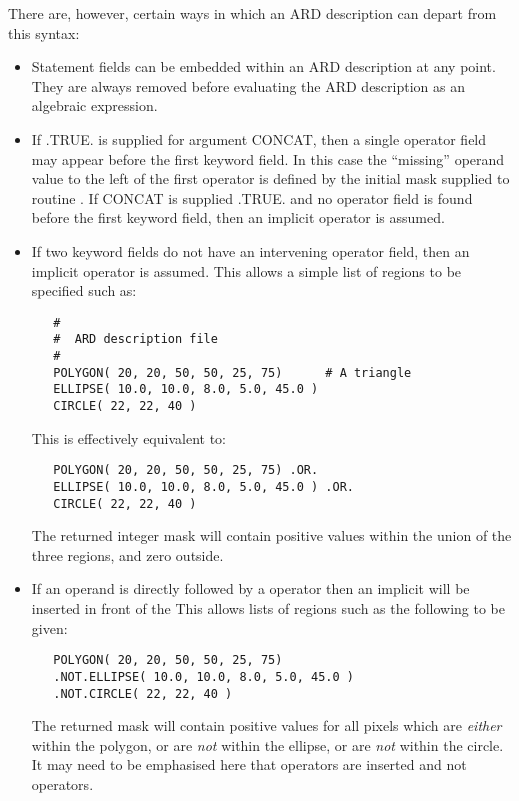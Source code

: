 There are, however, certain ways in which an ARD description can depart from 
this syntax:

\begin{itemize}

\item Statement fields can be embedded within an ARD description at any point. 
They are always removed before evaluating the ARD description as an algebraic 
expression.

\item If .TRUE. is supplied for  argument CONCAT, then a single
operator field may appear before the first keyword field. In this case the
``missing'' operand value to the left of the first operator is defined by the
initial mask supplied to routine . If CONCAT is supplied .TRUE. and no
operator field is found before the first keyword field, then an implicit 
operator is assumed. 

\item If two keyword fields do not have an intervening operator field, then an
implicit  operator is assumed. This allows a simple list of regions to 
be specified such as:

\small
\begin{verbatim}
   #
   #  ARD description file
   #
   POLYGON( 20, 20, 50, 50, 25, 75)      # A triangle
   ELLIPSE( 10.0, 10.0, 8.0, 5.0, 45.0 )
   CIRCLE( 22, 22, 40 )
\end{verbatim}
\normalsize

This is effectively equivalent to:

\small
\begin{verbatim}
   POLYGON( 20, 20, 50, 50, 25, 75) .OR.
   ELLIPSE( 10.0, 10.0, 8.0, 5.0, 45.0 ) .OR.
   CIRCLE( 22, 22, 40 )
\end{verbatim}
\normalsize

The returned integer mask will contain positive values within the union of the 
three regions, and zero outside.

\item If an operand is directly followed by a  operator then an implicit 
 will be inserted in front of the  This allows lists of regions such 
as the following to be given:

\small
\begin{verbatim}
   POLYGON( 20, 20, 50, 50, 25, 75)
   .NOT.ELLIPSE( 10.0, 10.0, 8.0, 5.0, 45.0 )
   .NOT.CIRCLE( 22, 22, 40 )
\end{verbatim}
\normalsize

The returned mask will contain positive values for all pixels which are {\em 
either} within the polygon, or are {\em not} within the ellipse, or are {\em 
not} within the circle. It may need to be emphasised here that  operators
are inserted and not  operators.

\end{itemize}

